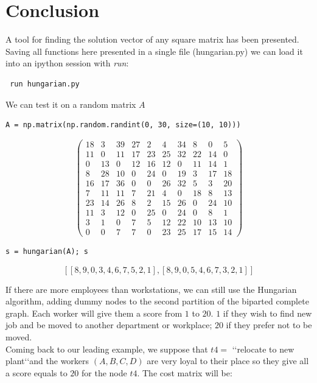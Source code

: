 \documentclass[12pt]{ClasseMatematicamente}
\begin{document}
\section*{Conclusion}\label{se:conclusion}
A tool for finding the solution vector of any square matrix has been presented. 
Saving all functions here presented in a single file (hungarian.py) we can load it into an ipython session with \emph{run}:
\begin{small}
 \begin{lstlisting}
 run hungarian.py
\end{lstlisting}
\end{small}
We can test it on a random matrix $A$
\begin{small}
 \begin{lstlisting}
A = np.matrix(np.random.randint(0, 30, size=(10, 10)))
\end{lstlisting}
$$
\left(\begin{array}{rrrrrrrrrr}
18 & 3 & 39 & 27 & 2 & 4 & 34 & 8 & 0
& 5 \\
11 & 0 & 11 & 17 & 23 & 25 & 32 & 22 &
14 & 0 \\
0 & 13 & 0 & 12 & 16 & 12 & 0 & 11 & 14
& 1 \\
8 & 28 & 10 & 0 & 24 & 0 & 19 & 3 & 17
& 18 \\
16 & 17 & 36 & 0 & 0 & 26 & 32 & 5 & 3
& 20 \\
7 & 11 & 11 & 7 & 21 & 4 & 0 & 18 & 8
& 13 \\
23 & 14 & 26 & 8 & 2 & 15 & 26 & 0 & 24
& 10 \\
11 & 3 & 12 & 0 & 25 & 0 & 24 & 0 & 8
& 1 \\
3 & 1 & 0 & 7 & 5 & 12 & 22 & 10 & 13
& 10 \\
0 & 0 & 7 & 7 & 0 & 23 & 25 & 17 & 15
& 14
\end{array}\right)
$$
\begin{lstlisting}
s = hungarian(A); s
\end{lstlisting}
$$
\left[\left[8, 9, 0, 3, 4, 6, 7, 5, 2, 1\right],
\left[8, 9, 0, 5, 4, 6, 7, 3, 2, 1\right]\right]
$$
\end{small}
If there are more employees than workstations, we can still use the Hungarian algorithm, adding dummy nodes to the second partition of the biparted complete graph. 
Each worker will give them a score from $1$ to $20$. $1$ if they wish to find new job and be moved to another department or workplace; $20$ if they prefer not to be moved.\\
Coming back to our leading example, we suppose that $t4 =$ \lq\lq relocate to new plant\lq\lq  and the workers $(A,B,C,D)$ are very loyal to their place so they give all a score equals to $20$ for the node $t4$. The cost matrix will be:
\end{document}
